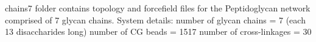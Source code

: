 chains7 folder contains topology and forcefield files for the Peptidoglycan network comprised of 7 glycan chains.
System details: 
number of glycan chains = 7 (each 13 disaccharides long)
number of CG beads = 1517
number of cross-linkages = 30

